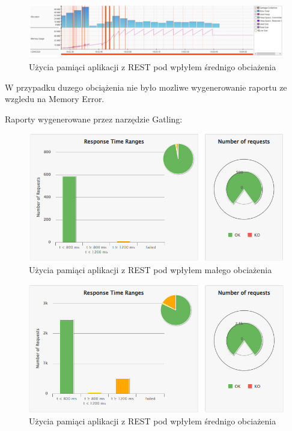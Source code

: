 \documentclass[runningheads,12pt]{llncs}
\begin{document}
\begin{figure}
    \includegraphics[width=\linewidth]{images/rest-memory-middle-graph.jpg}
    \caption{Użycia pamiąci aplikacji z REST pod wpłyłem średnigo obciażenia} \label{fig1}
\end{figure}

W przypadku duzego obciążenia nie było mozliwe wygenerowanie raportu ze wzgledu na Memory Error.


Raporty wygenerowane przez narzędzie Gatling:

\begin{figure}
    \includegraphics[width=\linewidth]{images/rest-gatling-low-graph.jpg}
    \caption{Użycia pamiąci aplikacji z REST pod wpłyłem małego obciażenia} \label{fig1}
\end{figure}

\begin{figure}
    \includegraphics[width=\linewidth]{images/rest-gatling-moddle-rest.jpg}
    \caption{Użycia pamiąci aplikacji z REST pod wpłyłem średnigo obciażenia} \label{fig1}
\end{figure}
\end{document}
